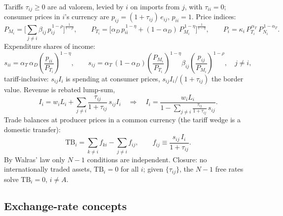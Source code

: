 \documentclass[11pt]{article}
\begin{document}
Tariffs $\tau_{ij} \geq 0$ are ad valorem, levied by $i$ on imports from $j$, with $\tau_{ii} = 0$; consumer prices in $i$'s currency are $p_{ij} = (1+\tau_{ij})\, e_{ij}$, $p_{ii} = 1$. Price indices:
\begin{equation}
P_{M_i} = \Big[ \textstyle\sum_{j\neq i} \beta_{ij}\, p_{ij}^{\,1-\rho} \Big]^{\frac{1}{1-\rho}},
\qquad
P_{T_i} = \Big[ \alpha_D\, p_{ii}^{\,1-\eta} + (1-\alpha_D)\, P_{M_i}^{\,1-\eta} \Big]^{\frac{1}{1-\eta}},
\qquad
P_i = \kappa_i\, P_{T_i}^{\,\alpha_T}\, P_{N_i}^{\,1-\alpha_T} .
\label{eq:indices}
\end{equation}
Expenditure shares of income:
\begin{equation}
s_{ii} = \alpha_T\, \alpha_D \left(\frac{p_{ii}}{P_{T_i}}\right)^{1-\eta},
\qquad
s_{ij} = \alpha_T\, (1-\alpha_D) \left(\frac{P_{M_i}}{P_{T_i}}\right)^{1-\eta}
\beta_{ij} \left(\frac{p_{ij}}{P_{M_i}}\right)^{1-\rho}, \quad j \neq i ,
\label{eq:sfor}
\end{equation}
tariff-inclusive: $s_{ij} I_i$ is spending at consumer prices, $s_{ij} I_i/(1+\tau_{ij})$ the border value. Revenue is rebated lump-sum,
\begin{equation}
I_i = w_i L_i + \sum_{j \neq i} \frac{\tau_{ij}}{1+\tau_{ij}}\, s_{ij} I_i
\quad\Longrightarrow\quad
I_i = \frac{w_i L_i}{1 - \sum_{j\neq i} \frac{\tau_{ij}}{1+\tau_{ij}}\, s_{ij}} .
\label{eq:income}
\end{equation}
Trade balances at producer prices in a common currency (the tariff wedge is a domestic transfer):
\begin{equation}
\mathrm{TB}_i = \sum_{k \neq i} f_{ki} - \sum_{j \neq i} f_{ij},
\qquad
f_{ij} \equiv \frac{s_{ij}\, I_i}{1+\tau_{ij}} .
\label{eq:tb}
\end{equation}
By Walras' law only $N-1$ conditions are independent. Closure: no internationally traded assets, $\mathrm{TB}_i = 0$ for all $i$; given $\{\tau_{ij}\}$, the $N-1$ free rates solve $\mathrm{TB}_i = 0$, $i \neq A$.

\subsection{Exchange-rate concepts}
\end{document}
